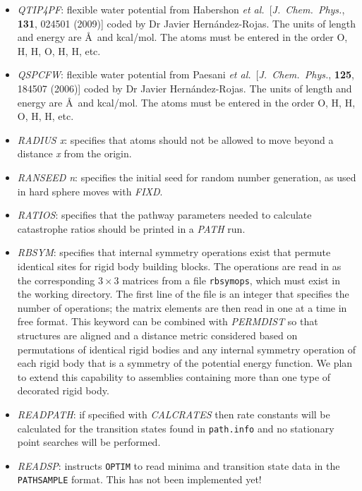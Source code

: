 \documentclass[12pt,a4paper,dvips]{article}
\begin{document}
\begin{itemize}
\item {\it QTIP4PF\/}: flexible water potential from  Habershon {\it et al.}~[{\it J.~Chem.~Phys.\/}, 
{\bf 131}, 024501 (2009)] coded by Dr Javier Hern\'andez-Rojas.
The units of length and energy are \AA\ and kcal/mol. The atoms must be entered in the
order O, H, H, O, H, H, etc.

\item {\it QSPCFW\/}: flexible water potential from  Paesani {\it et al.}~[{\it J.~Chem.~Phys.\/},
{\bf 125}, 184507 (2006)] coded by Dr Javier Hern\'andez-Rojas.
The units of length and energy are \AA\ and kcal/mol. The atoms must be entered in the
order O, H, H, O, H, H, etc.

\item {\it RADIUS x\/}: specifies that atoms should not be allowed to move beyond a 
distance {\it x\/} from the origin.

\item {\it RANSEED n\/}: specifies the initial seed for random number generation, as used in 
hard sphere moves with {\it FIXD}.

\item {\it RATIOS\/}: specifies that the pathway parameters needed to calculate catastrophe
ratios should be printed in a {\it PATH\/} run.

\item {\it RBSYM\/}: specifies that internal symmetry operations exist that permute
identical sites for rigid body building blocks. 
The operations are read in as the corresponding $3\times3$ matrices from a file
{\tt rbsymops}, which must exist in the working directory.
The first line of the file is an integer that specifies the number of operations; 
the matrix elements are then read in one at a time in free format.
This keyword can be combined with {\it PERMDIST\/} so that structures are aligned and
a distance metric considered based on permutations of identical rigid
bodies and any internal symmetry operation of each rigid body that is a symmetry
of the potential energy function.
We plan to extend this capability to assemblies containing more than one 
type of decorated rigid body.

\item {\it READPATH\/}: if specified with {\it CALCRATES\/} then rate constants will be
calculated for the transition states found in {\tt path.info} and no stationary point
searches will be performed.

\item {\it READSP\/}: instructs {\tt OPTIM} to read minima and 
transition state data in the {\tt PATHSAMPLE} format.
This has not been implemented yet!


\end{itemize}
\end{document}
